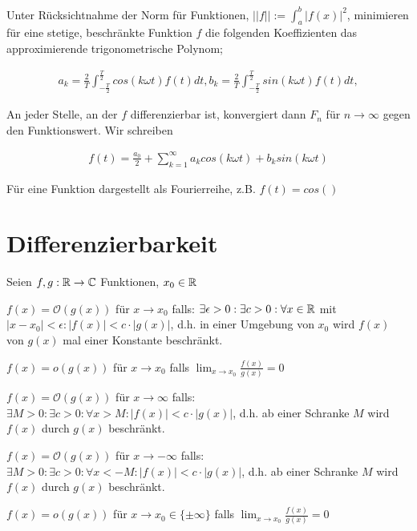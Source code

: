 \begin{satz}
	Unter Rücksichtnahme der Norm für Funktionen, $||f|| := \int_a^b |f(x)|^2$, minimieren für eine stetige, beschränkte Funktion $f$ die folgenden Koeffizienten das approximierende trigonometrische Polynom;
	
	\begin{align*}
		a_k = \frac{2}{T} \int_{-\frac{T}{2}}^{\frac{T}{2}} cos(k \omega t)f(t) dt,
		b_k = \frac{2}{T} \int_{-\frac{T}{2}}^{\frac{T}{2}} sin(k \omega t)f(t) dt,	
	\end{align*}
	
	An jeder Stelle, an der $f$ differenzierbar ist, konvergiert dann $F_n$ für $n \rightarrow \infty$ gegen den Funktionswert. Wir schreiben
	
	\begin{align*}
		f(t) = \frac{a_0}{2} + \sum_{k=1}^{\infty}a_k cos(k \omega t) + b_k sin(k \omega t)
	\end{align*}
\end{satz}

\begin{definition}[Spektrum]
	Für eine Funktion dargestellt als Fourierreihe, z.B. $f(t) = cos()$
\end{definition}

\pagebreak

\section{Differenzierbarkeit}

\begin{definition}
	Seien $f,g : \mathbb{R} \rightarrow \mathbb{C}$ Funktionen, $x_0 \in \mathbb{R}$
	\begin{description}[noitemsep]
		\item $f(x) = \mathcal{O}(g(x))$ für $x \rightarrow x_0$ falls: $\exists \epsilon > 0: \exists c > 0 : \forall x \in \mathbb{R}$ mit $|x - x _0| < \epsilon : |f(x)| < c \cdot |g(x)|$, d.h. in einer Umgebung von $x_0$ wird $f(x)$ von $g(x)$ mal einer Konstante beschränkt.
		\item $f(x) = o(g(x))$ für $x \rightarrow x_0$ falls $\lim_{x \rightarrow x_0} \frac{f(x)}{g(x)} = 0 $
		\item $f(x) = \mathcal{O}(g(x))$ für $x \rightarrow \infty$ falls: $\exists M > 0: \exists c > 0 : \forall x > M : |f(x)| < c \cdot |g(x)|$, d.h. ab einer Schranke $M$ wird $f(x)$ durch $g(x)$ beschränkt.
		\item $f(x) = \mathcal{O}(g(x))$ für $x \rightarrow -\infty$ falls: $\exists M > 0: \exists c > 0 : \forall x < -M : |f(x)| < c \cdot |g(x)|$, d.h. ab einer Schranke $M$ wird $f(x)$ durch $g(x)$ beschränkt.	
		\item $f(x) = o(g(x))$ für $x \rightarrow x_0 \in \{\pm \infty\}$ falls $\lim_{x \rightarrow x_0} \frac{f(x)}{g(x)} = 0 $
	\end{description}
\end{definition}

